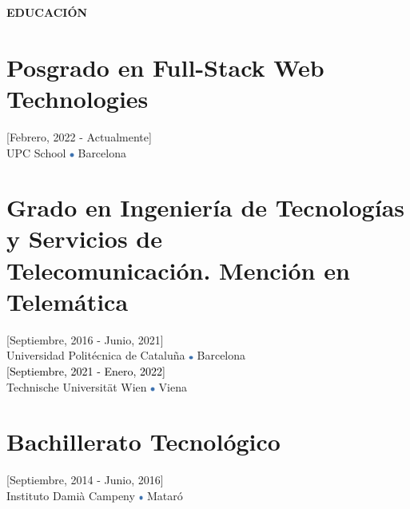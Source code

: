 \documentclass[../main.tex]{subfiles}
\begin{document}
    \vspace*{-0.4cm}
    \textbf{\textcolor{myCV2}{EDUCACIÓN\underline{\hspace{7.5cm}}}}
        \vspace*{-0.3cm}
        
        \section*{Posgrado en Full-Stack Web Technologies}
        \vspace*{-0.4cm}
        [Febrero, 2022 - Actualmente] \\
        UPC School
        \includegraphics[width=0.15cm]{assets/full.png} 
        Barcelona
        
        \vspace*{-0.25cm}
        \section*{Grado en Ingeniería de Tecnologías y Servicios de \\Telecomunicación. Mención en Telemática}
        \vspace*{-0.4cm}
        [Septiembre, 2016 - Junio, 2021] \\
        Universidad Politécnica de Cataluña 
        \includegraphics[width=0.15cm]{assets/full.png} 
        Barcelona \\
        \textcolor{black}{[Septiembre, 2021 - Enero, 2022]}\\
        Technische Universität Wien
        \includegraphics[width=0.15cm]{assets/full.png} 
        Viena
        
        \vspace*{-0.25cm}
        \section*{Bachillerato Tecnológico}
        \vspace*{-0.4cm}
        [Septiembre, 2014 - Junio, 2016] \\
        Instituto Damià Campeny
        \includegraphics[width=0.15cm]{assets/full.png} 
        Mataró

\end{document}
